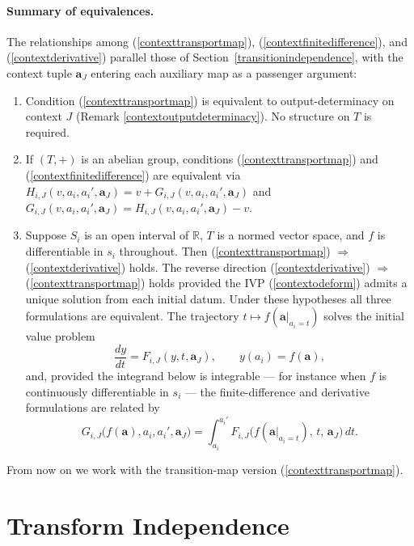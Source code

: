 \documentclass{article}
\theoremstyle{definition}
\theoremstyle{remark}
\begin{document}
\paragraph{Summary of equivalences.} The relationships among (\ref{contexttransportmap}), (\ref{contextfinitedifference}), and (\ref{contextderivative}) parallel those of Section~\ref{transitionindependence}, with the context tuple $\boldsymbol{a}_J$ entering each auxiliary map as a passenger argument:
\begin{enumerate}[label=(\alph*)]
\item Condition (\ref{contexttransportmap}) is equivalent to output-determinacy on context $J$ (Remark \ref{contextoutputdeterminacy}). No structure on $T$ is required.
\item If $(T, +)$ is an abelian group, conditions (\ref{contexttransportmap}) and (\ref{contextfinitedifference}) are equivalent via $H_{i,J}(v, a_i, a_i', \boldsymbol{a}_J) = v + G_{i,J}(v, a_i, a_i', \boldsymbol{a}_J)$ and $G_{i,J}(v, a_i, a_i', \boldsymbol{a}_J) = H_{i,J}(v, a_i, a_i', \boldsymbol{a}_J) - v$.
\item Suppose $S_i$ is an open interval of $\mathbb{R}$, $T$ is a normed vector space, and $f$ is differentiable in $s_i$ throughout. Then (\ref{contexttransportmap}) $\Rightarrow$ (\ref{contextderivative}) holds. The reverse direction (\ref{contextderivative}) $\Rightarrow$ (\ref{contexttransportmap}) holds provided the IVP (\ref{contextodeform}) admits a unique solution from each initial datum. Under these hypotheses all three formulations are equivalent. The trajectory $t \mapsto f(\boldsymbol{a}|_{a_i = t})$ solves the initial value problem
\[
\frac{dy}{dt} = F_{i,J}(y, t, \boldsymbol{a}_J), \qquad y(a_i) = f(\boldsymbol{a}),
\]
and, provided the integrand below is integrable --- for instance when $f$ is continuously differentiable in $s_i$ --- the finite-difference and derivative formulations are related by
\begin{equation}
\label{contextintegralform}
G_{i,J}\bigl(f(\boldsymbol{a}), a_i, a_i', \boldsymbol{a}_J\bigr) = \int_{a_i}^{a_i'} F_{i,J}\bigl(f(\boldsymbol{a}|_{a_i = t}),\, t,\, \boldsymbol{a}_J\bigr)\, dt.
\end{equation}
\end{enumerate}
From now on we work with the transition-map version (\ref{contexttransportmap}).


\newpage

\section{Transform Independence}
\label{transformindependence}
\end{document}
